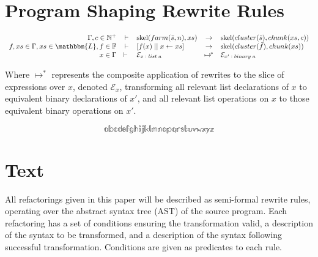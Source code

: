 \documentclass{article}
\newcommand{\Rewrite}[3]{#1 & \vdash{} & #2 & \mapsto{}^{\!\!\!*} & #3}
\begin{document}
\section{Program Shaping Rewrite Rules}
\label{sec:shaping-rewrites}

\[
  \begin{array}{rclcl}
    \Gamma, c \in \mathbb{N}^{+} & \vdash & \mathrm{skel}(farm(\bar{s}, n), xs) &
                                                                         \rightarrow
    & \mathrm{skel}(cluster(\bar{s}), chunk(xs, c)) \\
    f, xs \in \Gamma, xs \in \mathbbm{L}, f \in \mathbb{F} & \vdash & [f(x)\; ||\; x
                                                                     \leftarrow
                                                                     xs] &
                                                                           \rightarrow &
                                                                           \mathrm{skel}(cluster(\bar{f}),
                                                                           chunk(xs))
    \\
    \Rewrite{x \in \Gamma}{\mathcal{E}_{x\; :\; list\; a}}{\mathcal{E}_{x'\; :\; binary\; a}} 
  \end{array}
\]

\noindent
Where $\mapsto^{\!*}$ represents the composite application of rewrites to the
slice of expressions over $x$, denoted $\mathcal{E}_x$, transforming all relevant list
declarations of $x$ to equivalent binary declarations of $x'$, and all relevant
list operations on $x$ to those equivalent binary operations on $x'$.

\[
  \mathbb{a}
  \mathbb{b}
  \mathbb{c}
  \mathbb{d}
  \mathbb{e}
  \mathbb{f}
  \mathbb{g}
  \mathbb{h}
  \mathbb{i}
  \mathbb{j}
  \mathbb{k}
  \mathbb{l}
  \mathbb{m}
  \mathbb{n}
  \mathbb{o}
  \mathbb{p}
  \mathbb{q}
  \mathbb{r}
  \mathbb{s}
  \mathbb{t}
  \mathbb{u}
  \mathbb{v}
  \mathbb{w}
  \mathbb{x}
  \mathbb{y}
  \mathbb{z}
\]

\section{Text}

All refactorings given in this paper will be described as semi-formal rewrite
rules, operating over the abstract syntax tree (AST) of the source program.
Each refactoring has a set of conditions ensuring the transformation valid, a
description of the syntax to be transformed, and a description of the syntax
following successful transformation. Conditions are given as predicates to each
rule.
\end{document}
